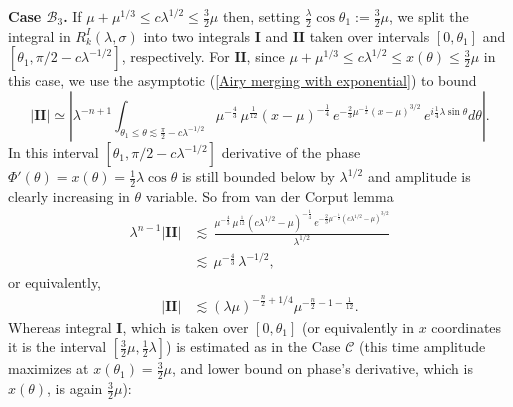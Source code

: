 \documentclass[11pt, reqno]{amsart}
\theoremstyle{plain}
\theoremstyle{remark}
\theoremstyle{example}
\theoremstyle{definition}
\numberwithin{equation}{section}
\begin{document}
\noindent \textbf{Case $\mathcal{B}_3$.} If $\mu + \mu^{1/3} \leq c \lambda^{1/2} \leq \frac{3}{2} \mu$ then, setting $\frac{\lambda}{2} \cos{ \theta_{1} }:= \frac{3}{2} \mu $, we split the integral in $R_{k}^{I}(\lambda, \sigma)$ into two integrals $\textbf{I}$ and $\textbf{II}$ taken over intervals $[0, \theta_{1}]$ and $[\theta_{1}, \pi/2 - c \lambda^{-1/2}]$, respectively. For $\textbf{II}$, since $\mu + \mu^{1/3} \leq c \lambda^{1/2} \leq x(\theta) \leq \frac{3}{2} \mu$ in this case, we use the asymptotic (\ref{Airy merging with exponential}) to bound
\begin{equation*}
  |\textbf{II}| \simeq \left| \lambda^{-n+1}  \int_{\theta_{1} \leq \theta \lesssim \frac{\pi}{2} - c \lambda^{-1/2}} \mu^{{-\textstyle\frac{4}{3}} } \,   \mu^{ {\textstyle\frac{1}{12} } }  (x- \mu)^{ - {\textstyle\frac{1}{4}  } } \, e^{ - {\frac{2}{3}  } \mu^{- \frac{1}{2}} (x- \mu)^{3/2}    }  \, e^{i \frac{1}{4} \lambda \sin{\theta}}    d \theta \right|.
\end{equation*}
In this interval $[\theta_{1}, \pi/2 - c \lambda^{-1/2}]$  derivative of the phase $\varPhi'(\theta)=x(\theta)= \frac{1}{2} \lambda \cos{\theta}$ is still bounded below by $\lambda^{1/2}$ and amplitude is clearly increasing in $\theta$ variable. So from van der Corput lemma 
\begin{equation}\label{theta1 to theta2}
  \begin{split}
   \lambda^{n-1}   | \textbf{II} | & \lesssim    \, \frac{ \mu^{{-\textstyle\frac{4}{3}} } \,   \mu^{ {\textstyle\frac{1}{12} } }  (c \lambda^{1/2} - \mu)^{ - {\textstyle\frac{1}{4}  } } \, e^{ - {\frac{2}{3}  } \mu^{- \frac{1}{2}} ( c \lambda^{1/2} - \mu  )^{3/2}    } } { \lambda^{1/2} } \\
   & \lesssim    \, \mu^{{-\textstyle\frac{4}{3}} } \,      \lambda^{-1/2}, 
  \end{split}
\end{equation}
or equivalently, 
\begin{equation*}
  \begin{split}
      | \textbf{II} | & \lesssim     (\lambda \mu)^{ -\frac{n}{2} + 1/4} \mu^{-\frac{n}{2}- 1- \frac{1}{12}}  .
  \end{split}
\end{equation*}
Whereas integral $\textbf{I}$, which is taken over $[0, \theta_{1}]$ (or equivalently in $x$ coordinates it is the interval $[\frac{3}{2} \mu, \frac{1}{2} \lambda]$) is estimated as in the  Case $\mathcal{C}$ (this time amplitude maximizes at $x(\theta_{1})= \frac{3}{2} \mu$, and lower bound on phase's derivative, which is  $x(\theta)$, is again $\frac{3}{2} \mu$): 
\end{document}
